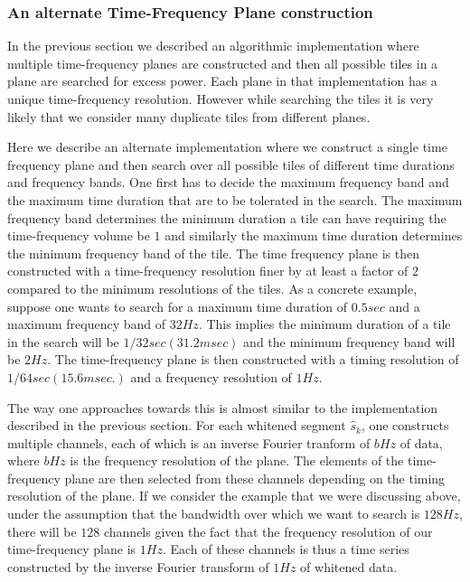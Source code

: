 \subsubsection{An alternate Time-Frequency Plane construction}
In the previous section we described an algorithmic implementation
where multiple time-frequency planes are constructed and then all 
possible tiles in a plane are searched for excess power.  Each plane 
in that implementation has a unique time-frequency resolution.  However
while searching the tiles it is very likely that we consider many 
duplicate tiles from different planes.
  
Here we describe an alternate implementation where we construct a single
time frequency plane and then search over all possible tiles of different
time durations and frequency bands.  One first has to decide the maximum 
frequency band and the maximum time duration that are to be tolerated in
the search.  The maximum frequency band determines the minimum duration
a tile can have requiring the time-frequency volume be $1$ and 
similarly the maximum time duration determines the minimum frequency band
of the tile.  The time frequency plane is then constructed with a 
time-frequency resolution finer by at least a factor of $2$ compared to
the minimum resolutions of the tiles.  As a concrete example,  
suppose one wants to search for a
 maximum time duration of  $0.5 sec$  and a maximum frequency band of 
$32 Hz$.  This implies the minimum duration of a tile in the search will
be  $1/32 sec (31.2 msec)$  and the minimum frequency band will be  $2 Hz$.
 The time-frequency plane is then constructed with a timing resolution
of $1/64 sec (15.6 msec.)$ and a frequency resolution of $1 Hz$.         

The way one approaches towards this is almost similar to the implementation
described in the previous section.  For each whitened segment
$\hat{s}_k$, one constructs multiple channels,  each of which is an
inverse Fourier tranform of $b Hz$ of data,  where $b Hz$
 is the frequency resolution of the plane.  The elements of the 
time-frequency plane are then selected from these channels depending
on the timing resolution of the plane.  If we consider the example
that we were discussing above,  under the assumption that the
bandwidth over which we want to search is $128 Hz$,  there will be
$128$ channels given the fact that the frequency resolution of our
time-frequency plane is $1 Hz$.  Each of these channels is thus a time
series constructed by the inverse Fourier transform of $1 Hz$ of 
whitened data.          

